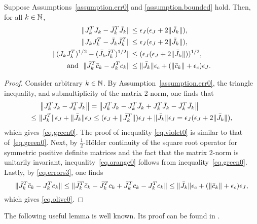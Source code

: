 \begin{lemma}\label{lemma.violet_orange_olive}
 Suppose Assumptions~\ref{assumption.err0} and \ref{assumption.bounded} hold. Then, for all $k \in \mathbb{N}$,
 \begin{subequations}
 \begin{align}
    \|J_k^T J_k - {\bar J}_k^T {\bar J}_k \| &\leq \epsilon_J ( \epsilon_J + 2 \|{\bar J}_k\| ), \label{eq.green0} \\
   \|J_k J_k^T - {\bar J}_k {\bar J}_k^T \| &\leq \epsilon_J ( \epsilon_J + 2 \|{\bar J}_k\| ), \label{eq.violet0} \\
   \|(J_k J_k^T)^{1/2} - ({\bar J}_k {\bar J}_k^T)^{1/2} \| &\leq (\epsilon_J ( \epsilon_J + 2 \|{\bar J}_k\| ) )^{1/2}, \label{eq.orange0} \\
   \text{and}\ \ \|{\bar J}_k^T {\bar c}_k - J_k^T c_k\| &\leq \|{\bar J}_k\| \epsilon_c + (\|{\bar c}_k\| + \epsilon_c) \epsilon_J. \label{eq.olive0}
  \end{align}
  \end{subequations}
\end{lemma}
\begin{proof}
  Consider arbitrary $k \in \mathbb{N}$.  By Assumption~\ref{assumption.err0}, the triangle inequality, and submultiplicity of the matrix 2-norm, one finds that
   \begin{align*}
     &\ \left\|J_k^T J_k - {\bar J}_k^T {\bar J}_k \right\| = \left\| J_k^T J_k - J_k^T {\bar J}_k + J_k^T {\bar J}_k - {\bar J}_k^T {\bar J}_k \right\| \\
     \leq&\ \|J_k^T\| \epsilon_J + \|{\bar J}_k\| \epsilon_J \leq (\epsilon_J + \|{\bar J}_k^T\|) \epsilon_J + \|{\bar J}_k\| \epsilon_J = \epsilon_J ( \epsilon_J + 2 \|{\bar J}_k\| ),
  \end{align*} 
which gives~\eqref{eq.green0}.  The proof of inequality \eqref{eq.violet0} is similar to that of~\eqref{eq.green0}.  Next, by $\tfrac12$-H\"older continuity of the square root operator for symmetric positive definite matrices and the fact that the matrix 2-norm is unitarily invariant, inequality~\eqref{eq.orange0} follows from inequality~\eqref{eq.green0}.  Lastly, by \eqref{eq.errors3}, one finds
  \begin{equation*}
    \|{\bar J}_k^T {\bar c}_k - J_k^T c_k \| \leq \|{\bar J}_k^T {\bar c}_k - {\bar J}_k^T c_k + {\bar J}_k^T c_k - J_k^T c_k \| \leq \|{\bar J}_k\| \epsilon_c + (\|{\bar c}_k\| + \epsilon_c) \epsilon_J, 
  \end{equation*} 
  which gives \eqref{eq.olive0}.
\end{proof}

The following useful lemma is well known.  Its proof can be found in \cite{byrd2000trust}.

